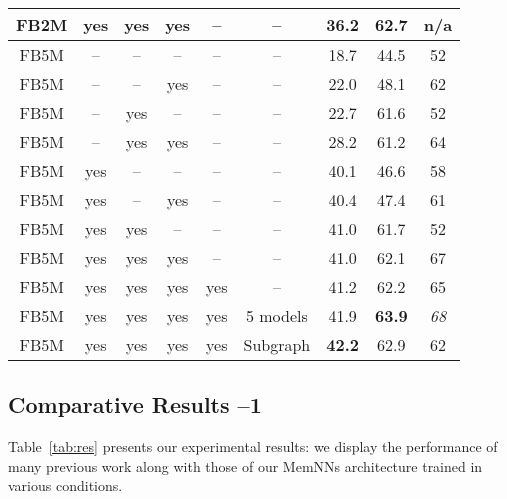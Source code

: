 \documentclass[11pt,a4paper]{article}
\newcommand{\wq}{{\sf WebQuestions}\xspace}
\newcommand{\fbq}{{\sf SimpleQuestions}\xspace}
\newcommand{\fbs}{{\sf FB2M}\xspace}
\newcommand{\fbb}{{\sf FB5M}\xspace}
\newcommand{\prp}{{\sf Paraphrases}\xspace}
\begin{document}
\begin{table*}
\begin{center}
\begin{small}
\begin{tabular}{|c|c|c|c|c|c|c|c|c|}
\hline
\fbs & yes & yes & yes & -- & -- & 36.2 & 62.7 & n/a \\
\hline
\fbb & -- & -- & -- & -- & -- & 18.7 & 44.5 & 52 \\
\fbb & -- & -- & yes & -- & -- & 22.0 & 48.1 & 62 \\
\fbb & -- & yes & -- & -- & -- & 22.7 & 61.6 & 52 \\
\fbb & -- & yes & yes & -- & -- & 28.2 & 61.2 & 64 \\
\fbb & yes & -- & -- & -- & -- & 40.1 & 46.6 & 58 \\
\fbb & yes & -- & yes & -- & -- & 40.4 & 47.4 & 61 \\
\fbb & yes & yes & -- & -- & -- & 41.0 & 61.7 & 52 \\
\fbb & yes & yes & yes & -- & -- & 41.0 & 62.1 & 67 \\
\hline
\fbb & yes & yes & yes & yes & -- & 41.2 & 62.2 & 65 \\
\fbb & yes & yes & yes & yes & 5 models & 41.9 & {\bf 63.9}  & {\it 68} \\
\fbb & yes & yes & yes & yes & Subgraph & {\bf 42.2} & 62.9 & 62 \\
\hline
\end{tabular}
\end{small}
\caption{\label{tab:res} {\bf Experimental results} for previous
  models of the literature and variants of Memory Networks. All
  results are on the test sets. {\sf WQ}, {\sf
    SIQ} and {\sf PRP} stand for \wq, \fbq and \prp respectively. More
details in the text.}
\end{center}
\vspace*{-1ex}
\end{table*}


\subsection{Comparative Results --1 }


Table~\ref{tab:res} presents our experimental results: we display the
performance of many previous work along with those of our MemNNs
architecture trained in various conditions.
\end{document}
